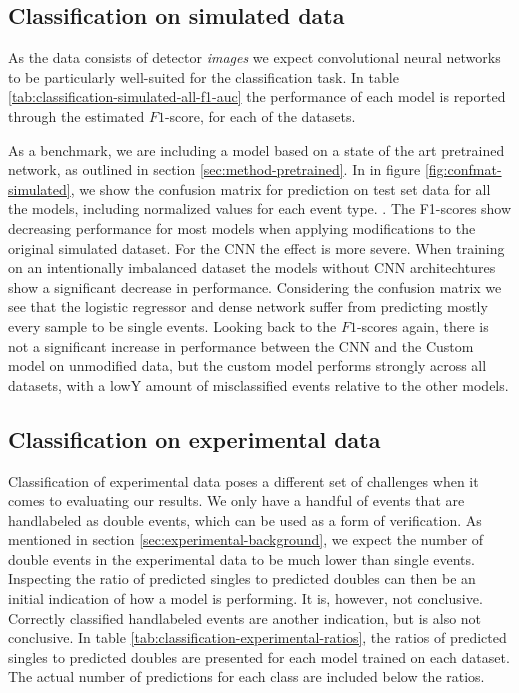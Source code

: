 \subsection{Classification on simulated data}
As the data consists of detector \textit{images} we expect convolutional
neural networks to be particularly well-suited for the classification task.
In table \ref{tab:classification-simulated-all-f1-auc} the performance of each model
is reported through the estimated $F1$-score, for each of the datasets. 

As a benchmark, we are including a model based on a state of the art pretrained 
network\cite{Simonyan2015}, as outlined in section \ref{sec:method-pretrained}. 
In in figure \ref{fig:confmat-simulated}, we show the confusion matrix for prediction
on test set data for all the models, including normalized values for each event type.
. The F1-scores show decreasing
performance for most models when applying modifications to the original simulated dataset.
For the CNN the effect is more severe. When training on an intentionally imbalanced
dataset the models without CNN architechtures show a significant decrease in performance.
Considering the confusion matrix we see that the logistic regressor and dense network
suffer from predicting mostly every sample to be single events. Looking back to the
$F1$-scores again, there is not a significant increase in performance between the
CNN and the Custom model on unmodified data, but the custom model performs strongly
across all datasets, with a lowY amount of misclassified events relative to the other
models.

\subsection{Classification on experimental data}
Classification of experimental data poses a different set of challenges when it comes
to evaluating our results. We only have a handful of events that are handlabeled as
double events, which can be used as a form of verification. As mentioned in section
\ref{sec:experimental-background}, we expect the number of double events in the experimental
data to be much lower than single events. Inspecting the ratio of predicted singles to predicted
doubles can then be an initial indication of how a model is performing. It is, however,
not conclusive. Correctly classified handlabeled events are another indication, but
is also not conclusive. In table \ref{tab:classification-experimental-ratios}, the ratios
of predicted singles to predicted doubles are presented for each model trained on each
dataset. The actual number of predictions for each class are included below the ratios.

